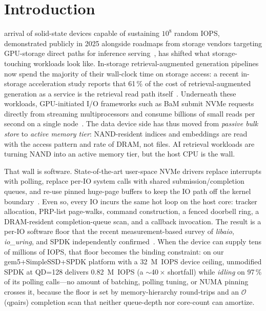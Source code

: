 \documentclass[journal]{IEEEtran}
\begin{document}
%
\section{Introduction}
\label{sec:intro}

 arrival of solid-state devices capable of sustaining
$10^8$ random IOPS, demonstrated publicly in 2025 alongside roadmaps from
storage vendors targeting GPU-storage direct paths for inference
serving~\cite{kioxia_fms2025}, has shifted what storage-touching workloads
look like. In-storage retrieval-augmented generation pipelines now spend the
majority of their wall-clock time on storage access: a recent in-storage
acceleration study reports that 61\,\% of the cost of retrieval-augmented
generation as a service is the retrieval read path itself~\cite{ragx_isca25}.
Underneath these workloads, GPU-initiated I/O frameworks such as BaM submit
NVMe requests directly from streaming multiprocessors and consume billions
of small reads per second on a single
node~\cite{bam_asplos23}. The data device side has thus moved from
\emph{passive bulk store} to \emph{active memory tier}: NAND-resident
indices and embeddings are read with the access pattern and rate of DRAM,
not files. AI retrieval workloads are turning NAND into an active memory
tier, but the host CPU is the wall.

That wall is software. State-of-the-art user-space NVMe drivers replace
interrupts with polling, replace per-IO system calls with shared
submission/completion queues, and re-use pinned huge-page buffers to keep
the IO path off the kernel boundary~\cite{spdk_modern_apis,spdk_docs}. Even
so, every IO incurs the same hot loop on the host core: tracker allocation,
PRP-list page-walks, command construction, a fenced doorbell ring, a
DRAM-resident completion-queue scan, and a callback invocation. The result
is a per-IO software floor that the recent measurement-based survey of
\emph{libaio}, \emph{io\_uring}, and SPDK independently
confirmed~\cite{spdk_modern_apis}. When the device can supply tens of
millions of IOPS, that floor becomes the binding constraint: on our
gem5+SimpleSSD+SPDK platform with a 32~M~IOPS device ceiling, unmodified
SPDK at QD=128 delivers 0.82~M~IOPS (a $\sim$40\,$\times$ shortfall) while
\emph{idling} on 97\,\% of its polling calls---no amount of batching,
polling tuning, or NUMA pinning crosses it, because the floor is set by
memory-hierarchy round-trips and an $\mathcal{O}$(qpairs) completion scan
that neither queue-depth nor core-count can amortize.
\end{document}

